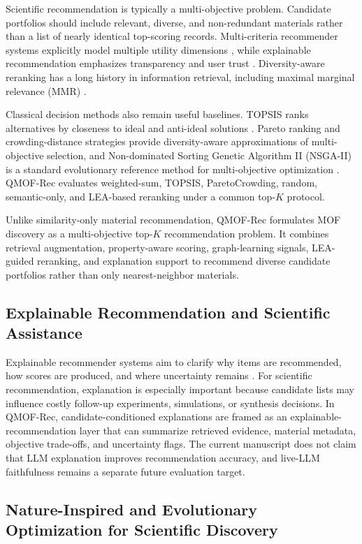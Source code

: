 \documentclass[12pt,a4paper]{article}
\begin{document}
Scientific recommendation is typically a multi-objective problem. Candidate portfolios should include relevant, diverse, and non-redundant materials rather than a list of nearly identical top-scoring records. Multi-criteria recommender systems explicitly model multiple utility dimensions \cite{adomavicius2011,jannach2014}, while explainable recommendation emphasizes transparency and user trust \cite{zhang2020}. Diversity-aware reranking has a long history in information retrieval, including maximal marginal relevance (MMR) \cite{carbonell1998}.

Classical decision methods also remain useful baselines. TOPSIS ranks alternatives by closeness to ideal and anti-ideal solutions \cite{hwang1981}. Pareto ranking and crowding-distance strategies provide diversity-aware approximations of multi-objective selection, and Non-dominated Sorting Genetic Algorithm II (NSGA-II) is a standard evolutionary reference method for multi-objective optimization \cite{deb2002}. QMOF-Rec evaluates weighted-sum, TOPSIS, ParetoCrowding, random, semantic-only, and LEA-based reranking under a common top-$K$ protocol.

Unlike similarity-only material recommendation, QMOF-Rec formulates MOF discovery as a multi-objective top-$K$ recommendation problem. It combines retrieval augmentation, property-aware scoring, graph-learning signals, LEA-guided reranking, and explanation support to recommend diverse candidate portfolios rather than only nearest-neighbor materials.

\subsection{Explainable Recommendation and Scientific Assistance}

Explainable recommender systems aim to clarify why items are recommended, how scores are produced, and where uncertainty remains \cite{zhang2020}. For scientific recommendation, explanation is especially important because candidate lists may influence costly follow-up experiments, simulations, or synthesis decisions. In QMOF-Rec, candidate-conditioned explanations are framed as an explainable-recommendation layer that can summarize retrieved evidence, material metadata, objective trade-offs, and uncertainty flags. The current manuscript does not claim that LLM explanation improves recommendation accuracy, and live-LLM faithfulness remains a separate future evaluation target.

\subsection{Nature-Inspired and Evolutionary Optimization for Scientific Discovery}
\end{document}
